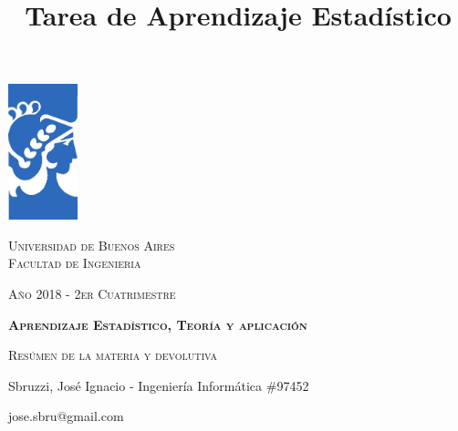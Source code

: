 \documentclass[12pt, a4paper]{article}
\title{Tarea de Aprendizaje Estadístico}
\author{}
\date{}
\begin{document}
\begin{titlepage} %
	\centering
	  \includegraphics[width=0.15\textwidth]{FIUBA_logo}\par
	  {\scshape\Large Universidad de Buenos Aires
      \\ Facultad de Ingenieria \par}
      {\scshape\small Año 2018 - 2er Cuatrimestre \par}
	  \vspace{1cm}
	  {\scshape\bfseries\LARGE Aprendizaje Estadístico, Teoría y aplicación\par}
	  \vspace{0.5cm}
	  \vspace{1cm}
      {\scshape\large Resúmen de la materia y devolutiva \par}
      \vspace{0.5cm
      \raggedright}
      \vspace{0.5cm}
    \centering
	  {\normalsize Sbruzzi, José Ignacio - Ingeniería Informática \#97452 \par}
      {\small  jose.sbru@gmail.com \par}
\end{titlepage} %
\newpage
\tableofcontents
\newpage
\end{document}
